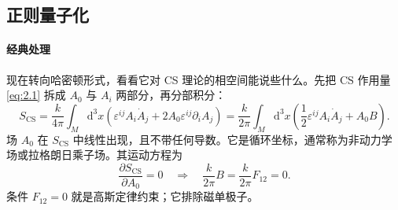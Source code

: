 \documentclass[11pt,a4paper]{article}
\newcommand{\dd}{\mathrm{d}}
\newcommand{\SCS}{S_{\mathrm{CS}}}
\begin{document}



\subsection{正则量子化}\label{sec:2.3}

\paragraph{经典处理}现在转向哈密顿形式，看看它对 CS 理论的相空间能说些什么。先把 CS 作用量 \eqref{eq:2.1} 拆成 $A_0$ 与 $A_i$ 两部分，再分部积分：
\begin{equation}\tag{2.20}\label{eq:2.20}
  \SCS
  = \frac{k}{4\pi}\int_M \dd^3x\left(\varepsilon^{ij}A_i\dot A_j + 2A_0\varepsilon^{ij}\partial_iA_j\right)
  = \frac{k}{2\pi}\int_M \dd^3x\left(\frac12\varepsilon^{ij}A_i\dot A_j + A_0B\right).
\end{equation}
场 $A_0$ 在 $\SCS$ 中线性出现，且不带任何导数。它是循环坐标，通常称为非动力学场或拉格朗日乘子场。其运动方程为
\begin{equation}\tag{2.21}\label{eq:2.21}
  \frac{\partial \SCS}{\partial A_0} = 0
  \quad\Longrightarrow\quad
  \frac{k}{2\pi}B = \frac{k}{2\pi}F_{12} = 0.
\end{equation}
条件 $F_{12}=0$ 就是高斯定律约束；它排除磁单极子。
\end{document}
